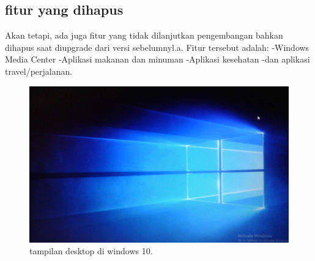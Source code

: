 		\subsection{fitur yang dihapus}
			Akan tetapi, ada juga fitur yang tidak dilanjutkan pengembangan bahkan dihapus saat diupgrade dari versi sebelumnyl.a. Fitur tersebut adalah:
			-Windows Media Center
			-Aplikasi makanan dan minuman
			-Aplikasi kesehatan
			-dan aplikasi travel/perjalanan.


\begin{figure}[ht]
\centerline{\includegraphics[width=1\textwidth]{figures/tampilanwindows10.JPG}}
\caption{tampilan desktop di windows 10.}
\label{tampilanwindows10}
\end{figure}